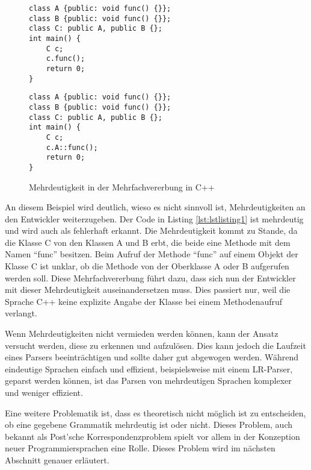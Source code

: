 \documentclass[runningheads]{llncs}
\begin{document}
	\begin{figure}
		\centering
		\begin{minipage}{0.48\textwidth}
			\begin{lstlisting}[style=lstStyle,label={lst:lstlisting1}]
class A {public: void func() {}};
class B {public: void func() {}};
class C: public A, public B {};
int main() {
	C c;
	c.func();
	return 0;
}
			\end{lstlisting}
		\end{minipage}
		\hfill
		\begin{minipage}{0.48\textwidth}
			\begin{lstlisting}[style=lstStyle,label={lst:lstlisting2}]
class A {public: void func() {}};
class B {public: void func() {}};
class C: public A, public B {};
int main() {
	C c;
	c.A::func();
	return 0;
}
			\end{lstlisting}
		\end{minipage}
		\caption{Mehrdeutigkeit in der Mehrfachvererbung in C++}
		\label{fig:figure3}
	\end{figure}

	An diesem Beispiel wird deutlich,
	wieso es nicht sinnvoll ist, Mehrdeutigkeiten an den Entwickler weiterzugeben.
	Der Code in Listing \ref{lst:lstlisting1} ist mehrdeutig und wird auch als fehlerhaft erkannt.
	Die Mehrdeutigkeit kommt zu Stande, da die Klasse C von den Klassen A und B erbt,
	die beide eine Methode mit dem Namen ``func'' besitzen.
	Beim Aufruf der Methode ``func'' auf einem Objekt der Klasse C ist unklar,
	ob die Methode von der Oberklasse A oder B aufgerufen werden soll.
	Diese Mehrfachvererbung führt dazu, dass sich nun der Entwickler mit dieser Mehrdeutigkeit auseinandersetzen muss.
	Dies passiert nur, weil die Sprache C++ keine explizite Angabe der Klasse bei einem Methodenaufruf verlangt.

	Wenn Mehrdeutigkeiten nicht vermieden werden können,
	kann der Ansatz versucht werden, diese zu erkennen und aufzulösen.
	Dies kann jedoch die Laufzeit eines Parsers beeinträchtigen und sollte daher gut abgewogen werden.
	Während eindeutige Sprachen einfach und effizient, beispielsweise mit einem LR-Parser, geparst werden können,
	ist das Parsen von mehrdeutigen Sprachen komplexer und weniger effizient.

	Eine weitere Problematik ist, dass es theoretisch nicht möglich ist zu entscheiden,
	ob eine gegebene Grammatik mehrdeutig ist oder nicht.
	Dieses Problem, auch bekannt als Post'sche Korrespondenzproblem
	spielt vor allem in der Konzeption neuer Programmiersprachen eine Rolle.
	Dieses Problem wird im nächsten Abschnitt genauer erläutert.
\end{document}

